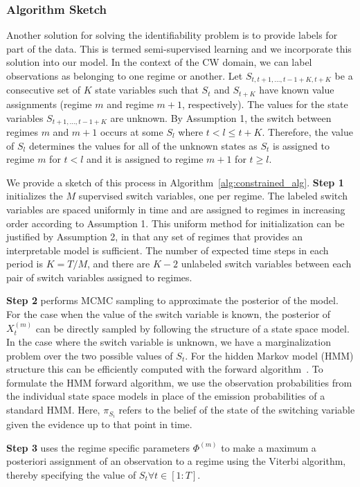 \subsubsection{Algorithm Sketch}
Another solution for solving the identifiability problem is to provide labels for part of the data. This is termed semi-supervised learning and we incorporate this solution into our model. In the context of the CW domain, we can label observations as belonging to one regime or another. Let $S_{t, t+1,\ldots, t-1+K,t+K}$ be a consecutive set of $K$ state variables such that $S_t$ and $S_{t+K}$ have known value assignments (regime $m$ and regime $m+1$, respectively). The values for the state variables $S_{t+1,\ldots,t-1+K}$ are unknown. By Assumption 1, the switch between regimes $m$ and $m+1$ occurs at some $S_l$ where $t < l \leq t+K$. Therefore, the value of $S_l$ determines the values for all of the unknown states as $S_t$ is assigned to regime $m$ for $t<l$ and it is assigned to regime $m+1$ for $t \geq l$.

We provide a sketch of this process in Algorithm~\ref{alg:constrained_alg}. \textbf{Step 1} initializes the $M$ supervised switch variables, one per regime. The labeled switch variables are spaced uniformly in time and are assigned to regimes in increasing order according to Assumption 1. This uniform method for initialization can be justified  by Assumption 2, in that  any set of regimes  that provides an interpretable model is sufficient. The number of expected  time steps in each period is $K=T/M$, and there are  $K-2$ unlabeled switch variables between each pair of  switch variables assigned to regimes.

\textbf{Step 2} performs MCMC sampling to approximate the posterior of the model. For the case when the value of the switch variable is known, the posterior of $X^{(m)}_t$ can be directly sampled by following the structure of a state space model. In the case where the switch variable is unknown, we have a marginalization problem over the two possible values of $S_t$. For the hidden Markov model (HMM) structure this can be efficiently computed with the forward algorithm~\citep{shumway2000time}. To formulate the HMM forward algorithm, we use the observation probabilities from the individual state space models in place of the emission probabilities of a standard HMM. Here, $\pi_{S_i}$ refers to the belief of the state of the switching variable given the evidence up to that point in time.

\textbf{Step 3} uses the regime specific parameters $\Phi^{(m)}$ to make a maximum a posteriori assignment of an observation to a regime using the Viterbi algorithm, thereby specifying the value of $S_t \forall t \in [1:T]$.

